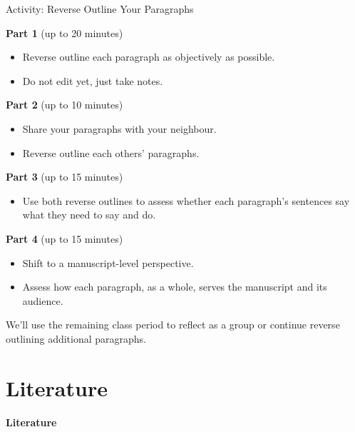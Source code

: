 \documentclass{beamer}
\begin{document}
\begin{frame}{Activity: Reverse Outline Your Paragraphs}

  \footnotesize
  \textbf{Part 1} (up to 20 minutes)
  \begin{itemize}
    \item  Reverse outline each paragraph as objectively as possible.
    \item Do not edit yet, just take notes.
  \end{itemize}

  \medskip
  \textbf{Part 2} (up to 10 minutes)
  \begin{itemize}
    \item  Share your paragraphs with your neighbour.
    \item Reverse outline each others' paragraphs.
  \end{itemize}

  \medskip
  \textbf{Part 3} (up to 15 minutes)
  \begin{itemize}
    \item Use both reverse outlines to assess whether each paragraph's sentences say what they need to say and do.
  \end{itemize}

  \medskip
  \textbf{Part 4} (up to 15 minutes)
  \begin{itemize}
    \item Shift to a manuscript-level perspective.
    \item Assess how each paragraph, as a whole, serves the manuscript
      and its audience.
  \end{itemize}

  \medskip
  We'll use the remaining class period to reflect as a group or continue reverse outlining additional paragraphs.

\end{frame}



\section{Literature}

\begin{frame}
  \centering
  \vfill
  {\Large\bfseries Literature}
  \vfill
\end{frame}
\end{document}
